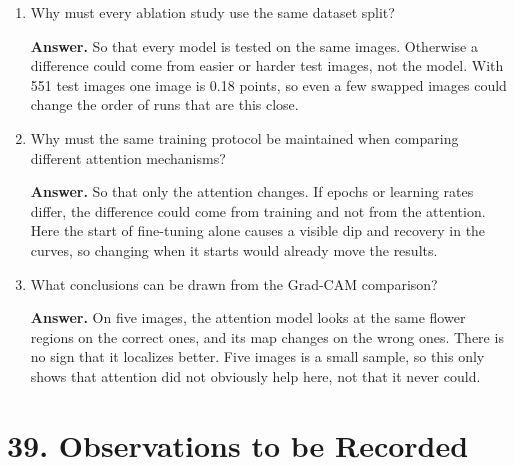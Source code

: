 \documentclass[10pt]{article}
\begin{document}
\begin{enumerate}
\item Why must every ablation study use the same dataset split?

\textbf{Answer.} So that every model is tested on the same images. Otherwise a difference could come from easier or harder test images, not the model. With 551 test images one image is 0.18 points, so even a few swapped images could change the order of runs that are this close.

\item Why must the same training protocol be maintained when comparing different attention mechanisms?

\textbf{Answer.} So that only the attention changes. If epochs or learning rates differ, the difference could come from training and not from the attention. Here the start of fine-tuning alone causes a visible dip and recovery in the curves, so changing when it starts would already move the results.

\item What conclusions can be drawn from the Grad-CAM comparison?

\textbf{Answer.} On five images, the attention model looks at the same flower regions on the correct ones, and its map changes on the wrong ones. There is no sign that it localizes better. Five images is a small sample, so this only shows that attention did not obviously help here, not that it never could.

\end{enumerate}

\section*{39. Observations to be Recorded}
\end{document}
